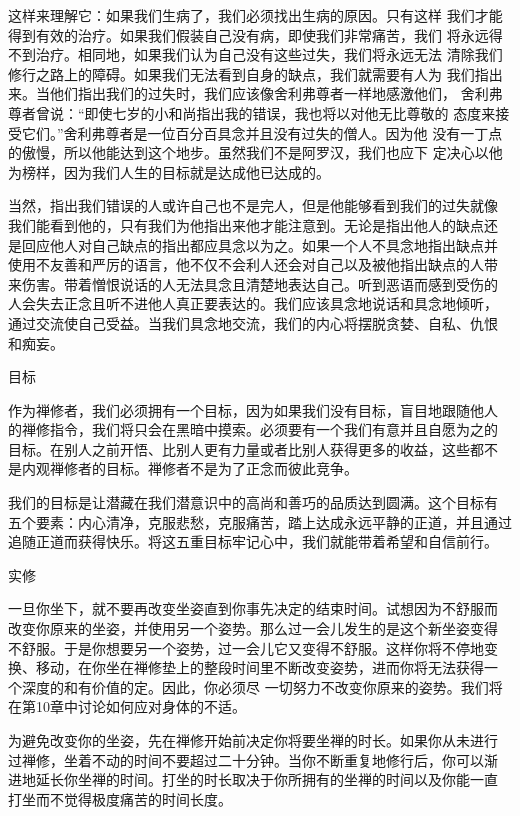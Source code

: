 这样来理解它：如果我们生病了，我们必须找出生病的原因。只有这样
我们才能得到有效的治疗。如果我们假装自己没有病，即使我们非常痛苦，我们
将永远得不到治疗。相同地，如果我们认为自己没有这些过失，我们将永远无法
清除我们修行之路上的障碍。如果我们无法看到自身的缺点，我们就需要有人为
我们指出来。当他们指出我们的过失时，我们应该像舍利弗尊者一样地感激他们，
舍利弗尊者曾说：“即使七岁的小和尚指出我的错误，我也将以对他无比尊敬的
态度来接受它们。”舍利弗尊者是一位百分百具念并且没有过失的僧人。因为他
没有一丁点的傲慢，所以他能达到这个地步。虽然我们不是阿罗汉，我们也应下
定决心以他为榜样，因为我们人生的目标就是达成他已达成的。

当然，指出我们错误的人或许自己也不是完人，但是他能够看到我们的过失就像
我们能看到他的，只有我们为他指出来他才能注意到。无论是指出他人的缺点还
是回应他人对自己缺点的指出都应具念以为之。如果一个人不具念地指出缺点并
使用不友善和严厉的语言，他不仅不会利人还会对自己以及被他指出缺点的人带
来伤害。带着憎恨说话的人无法具念且清楚地表达自己。听到恶语而感到受伤的
人会失去正念且听不进他人真正要表达的。我们应该具念地说话和具念地倾听，
通过交流使自己受益。当我们具念地交流，我们的内心将摆脱贪婪、自私、仇恨
和痴妄。

\subsectcnon 目标

作为禅修者，我们必须拥有一个目标，因为如果我们没有目标，盲目地跟随他人
的禅修指令，我们将只会在黑暗中摸索。必须要有一个我们有意并且自愿为之的
目标。在别人之前开悟、比别人更有力量或者比别人获得更多的收益，这些都不
是内观禅修者的目标。禅修者不是为了正念而彼此竞争。

我们的目标是让潜藏在我们潜意识中的高尚和善巧的品质达到圆满。这个目标有
五个要素：内心清净，克服悲愁，克服痛苦，踏上达成永远平静的正道，并且通过
追随正道而获得快乐。将这五重目标牢记心中，我们就能带着希望和自信前行。

\vfill
\subsectcnon 实修

一旦你坐下，就不要再改变坐姿直到你事先决定的结束时间。试想因为不舒服而
改变你原来的坐姿，并使用另一个姿势。那么过一会儿发生的是这个新坐姿变得
不舒服。于是你想要另一个姿势，过一会儿它又变得不舒服。这样你将不停地变
换、移动，在你坐在禅修垫上的整段时间里不断改变姿势，进而你将无法获得一
个深度的和有价值的定。因此，你必须尽
一切努力不改变你原来的姿势。我们将在第10章中讨论如何应对身体的不适。

为避免改变你的坐姿，先在禅修开始前决定你将要坐禅的时长。如果你从未进行
过禅修，坐着不动的时间不要超过二十分钟。当你不断重复地修行后，你可以渐
进地延长你坐禅的时间。打坐的时长取决于你所拥有的坐禅的时间以及你能一直
打坐而不觉得极度痛苦的时间长度。

